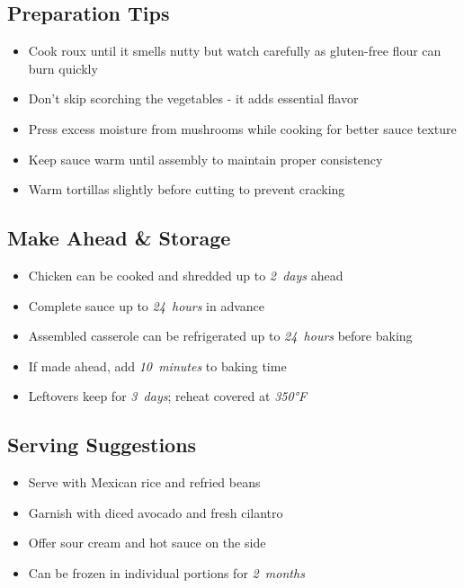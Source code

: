 \documentclass[11pt,letterpaper]{article}
\begin{document}
{\begin{multicols}{2}
\subsection*{Preparation Tips}
\begin{itemize}
    \item Cook roux until it smells nutty but watch carefully as gluten-free flour can burn quickly
    \item Don't skip scorching the vegetables - it adds essential flavor
    \item Press excess moisture from mushrooms while cooking for better sauce texture
    \item Keep sauce warm until assembly to maintain proper consistency
    \item Warm tortillas slightly before cutting to prevent cracking
\end{itemize}

\subsection*{Make Ahead \& Storage}
\begin{itemize}
    \item Chicken can be cooked and shredded up to \textit{2~days} ahead
    \item Complete sauce up to \textit{24~hours} in advance
    \item Assembled casserole can be refrigerated up to \textit{24~hours} before baking
    \item If made ahead, add \textit{10~minutes} to baking time
    \item Leftovers keep for \textit{3~days}; reheat covered at \textit{350°F}
\end{itemize}

\subsection*{Serving Suggestions}
\begin{itemize}
    \item Serve with Mexican rice and refried beans
    \item Garnish with diced avocado and fresh cilantro
    \item Offer sour cream and hot sauce on the side
    \item Can be frozen in individual portions for \textit{2~months}
\end{itemize}

\end{multicols}
}
\end{document}
